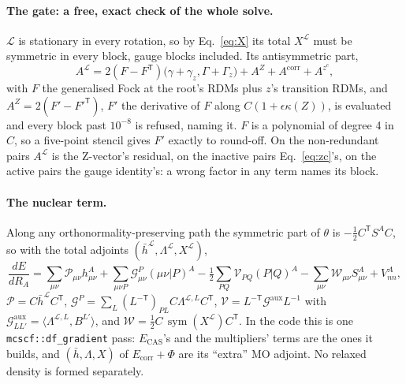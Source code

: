 \documentclass[11pt]{article}
\newcommand{\code}[1]{\texttt{#1}}
\newcommand{\Ecas}{E_{\mathrm{CAS}}}
\newcommand{\Ecorr}{E_{\mathrm{corr}}}
\newcommand{\hb}{\bar h}
\newcommand{\Lb}{\Lambda}
\newcommand{\T}{\mathsf T}
\newcommand{\sym}{\operatorname{sym}}
\begin{document}
\paragraph{The gate: a free, exact check of the whole solve.} $\mathcal L$
is stationary in every rotation, so by Eq.~\eqref{eq:X} its total
$X^{\mathcal L}$ must be symmetric in every block, gauge blocks included. Its antisymmetric part,
\begin{equation}
  A^{\mathcal L} = 2(F - F^\T)\bigl(\gamma + \gamma_z, \Gamma + \Gamma_z\bigr) + A^Z + A^{\mathrm{corr}} + A^{z^c},
\end{equation}
with $F$ the generalised Fock at the root's RDMs plus $z$'s transition RDMs,
and $A^Z = 2(F' - F'^\T)$, $F'$ the derivative of $F$ along $C(1 + \epsilon\kappa(Z))$,
is evaluated and every block past $10^{-8}$ is refused, naming it. $F$ is a
polynomial of degree 4 in $C$, so a five-point stencil gives $F'$ exactly to
round-off. On the non-redundant pairs $A^{\mathcal L}$ is the Z-vector's
residual, on the inactive pairs Eq.~\eqref{eq:zc}'s, on the active pairs the
gauge identity's: a wrong factor in any term names its block.

\paragraph{The nuclear term.} Along any orthonormality-preserving path the
symmetric part of $\theta$ is $-\tfrac12 C^\T S^A C$, so with the total
adjoints $(\hb^{\mathcal L}, \Lb^{\mathcal L}, X^{\mathcal L})$,
\begin{equation}
  \frac{dE}{dR_A} = \sum_{\mu\nu}\mathcal P_{\mu\nu}h^{A}_{\mu\nu}
  + \sum_{\mu\nu P}\mathcal G^P_{\mu\nu}(\mu\nu|P)^{A}
  - \tfrac12\sum_{PQ}\mathcal V_{PQ}(P|Q)^{A}
  - \sum_{\mu\nu}\mathcal W_{\mu\nu}S^{A}_{\mu\nu} + V_{nn}^{A},
  \label{eq:grad}
\end{equation}
$\mathcal P = C\hb^{\mathcal L}C^\T$,
$\mathcal G^P = \sum_L(L^{-\T})_{PL}C\Lb^{\mathcal L,L}C^\T$,
$\mathcal V = L^{-\T}\mathcal G^{\mathrm{aux}}L^{-1}$ with
$\mathcal G^{\mathrm{aux}}_{LL'} = \langle\Lb^{\mathcal L,L}, B^{L'}\rangle$,
and $\mathcal W = \tfrac12 C\,\sym(X^{\mathcal L})C^\T$. In the code this is
one \code{mcscf::df\_gradient} pass: $\Ecas$'s and the multipliers' terms are
the ones it builds, and $(\hb, \Lb, X)$ of $\Ecorr + \Phi$ are its
``extra'' MO adjoint. No relaxed density is formed separately.
\end{document}
